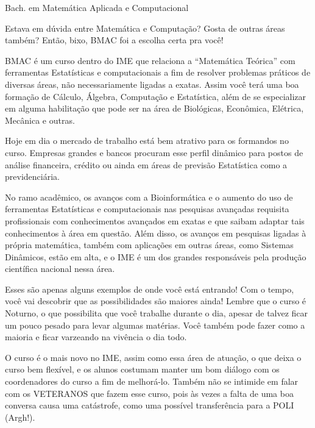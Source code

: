 \begin{subsecao}{Bach. em Matemática Aplicada e Computacional}

Estava em dúvida entre Matemática e Computação? Gosta de outras áreas também?
Então, bixo, BMAC foi a escolha certa pra você!

BMAC é um curso dentro do IME que relaciona a ``Matemática Teórica'' com
ferramentas Estatísticas e computacionais a fim de resolver problemas práticos
de diversas áreas, não necessariamente ligadas a exatas. Assim você terá uma boa
formação de Cálculo, Álgebra, Computação e Estatística, além de se especializar
em alguma habilitação que pode ser na área de Biológicas, Econômica, Elétrica,
Mecânica e outras.

Hoje em dia o mercado de trabalho está bem atrativo para os formandos no curso.
Empresas grandes e bancos procuram esse perfil dinâmico para postos de análise
financeira, crédito ou ainda em áreas de previsão Estatística como a
previdenciária.

No ramo acadêmico, os avanços com a Bioinformática e o aumento do uso de
ferramentas Estatísticas e computacionais nas pesquisas avançadas requisita
profissionais com conhecimentos avançados em exatas e que saibam adaptar tais
conhecimentos à área em questão. Além disso, os avanços em pesquisas ligadas à
própria matemática, também com aplicações em outras áreas, como Sistemas
Dinâmicos, estão em alta, e o IME é um dos grandes responsáveis pela produção
científica nacional nessa área.

Esses são apenas alguns exemplos de onde você está entrando! Com o tempo, você vai
descobrir que as possibilidades são maiores ainda! Lembre que o
curso é Noturno, o que possibilita que você trabalhe durante o dia, apesar de talvez
ficar um pouco pesado para levar algumas matérias. Você também pode fazer como
a maioria e ficar varzeando na vivência o dia todo.

O curso é o mais novo no IME, assim como essa área de atuação, o que deixa o
curso bem flexível, e os alunos costumam manter um bom diálogo com os
coordenadores do curso a fim de melhorá-lo. Também não se intimide em falar com
os VETERANOS que fazem esse curso, pois às vezes a falta de uma boa conversa
causa uma catástrofe, como uma possível transferência para a POLI (Argh!).

\end{subsecao}
